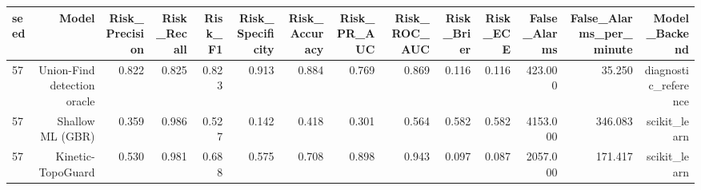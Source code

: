 \begin{tabular}{lrrrrrrrrrrrrr}
\toprule
seed & Model & Risk\_Precision & Risk\_Recall & Risk\_F1 & Risk\_Specificity & Risk\_Accuracy & Risk\_PR\_AUC & Risk\_ROC\_AUC & Risk\_Brier & Risk\_ECE & False\_Alarms & False\_Alarms\_per\_minute & Model\_Backend \\
\midrule
57 & Union-Find detection oracle & 0.822 & 0.825 & 0.823 & 0.913 & 0.884 & 0.769 & 0.869 & 0.116 & 0.116 & 423.000 & 35.250 & diagnostic\_reference \\
57 & Shallow ML (GBR) & 0.359 & 0.986 & 0.527 & 0.142 & 0.418 & 0.301 & 0.564 & 0.582 & 0.582 & 4153.000 & 346.083 & scikit\_learn \\
57 & Kinetic-TopoGuard & 0.530 & 0.981 & 0.688 & 0.575 & 0.708 & 0.898 & 0.943 & 0.097 & 0.087 & 2057.000 & 171.417 & scikit\_learn \\
\bottomrule
\end{tabular}
